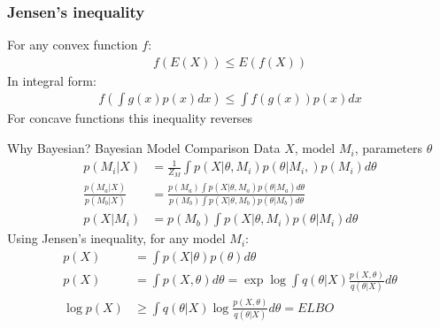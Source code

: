 \documentclass[xcolor=svgnames,table]{beamer}
\begin{document}
\begin{frame}
\frametitle{Jensen's inequality}
\begin{center}
\end{center}
 {
For any convex function $f$:
  \begin{align}
    f(E(X)) \leq E(f(X))
  \end{align}
}
 {
In integral form: 
\begin{align}
  f\left(\int g(x) p(x) dx \right) \leq \int f(g(x)) p(x) dx
\end{align}
}
For concave functions this inequality reverses
\end{frame}

\begin{frame}[fragile]{Why Bayesian? Bayesian Model Comparison}
Data $X$,  model $M_i$, parameters $\theta$
\begin{align}
    p(M_i | X) &= \frac{1}{Z_M} \int p(X | \theta, M_i) p(\theta | M_i,) p(M_i) d\theta \\
    \frac{p(M_a | X)}{p(M_b | X)} &= \frac{p(M_a) \int p(X | \theta, M_a) p(\theta | M_a)d\theta  }{p(M_b) \int p(X | \theta, M_b) p(\theta | M_b)d\theta} \\
    p(X | M_i) &= p(M_b) \int p(X | \theta, M_i) p(\theta | M_i)d\theta
\end{align}
Using Jensen's inequality, for any model $M_i$:
\begin{align}
    p(X) &= \int p(X | \theta) p(\theta)d\theta \\
    p(X) &= \int p(X, \theta) d\theta = \exp \log \int q(\theta | X) \frac{p(X, \theta)}{q(\theta | X)} d\theta\\ 
    \log p(X) &\geq \int q(\theta | X) \log \frac{p(X, \theta)}{q(\theta | X)} d\theta = ELBO
\end{align}

\end{frame}
\end{document}
